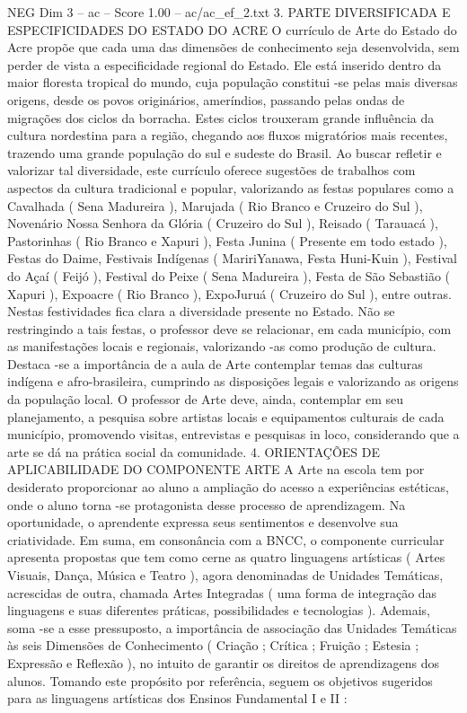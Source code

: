 \begin{textsample}{NEG Dim 3 – ac – Score 1.00 – ac/ac\_ef\_2.txt}  \label{ex:f3_neg_262}
3.
PARTE DIVERSIFICADA E ESPECIFICIDADES DO ESTADO DO ACRE O currículo de Arte do Estado do Acre propõe que cada uma das dimensões de conhecimento seja desenvolvida, sem perder de vista a especificidade regional do Estado.
Ele está inserido dentro da maior floresta tropical do mundo, cuja população constitui -se pelas mais diversas origens, desde os povos originários, ameríndios, passando pelas ondas de migrações dos ciclos da borracha.
Estes ciclos trouxeram grande influência da cultura nordestina para a região, chegando aos fluxos migratórios mais recentes, trazendo uma grande população do sul e sudeste do Brasil.
Ao buscar refletir e valorizar tal diversidade, este currículo oferece sugestões de trabalhos com aspectos da cultura tradicional e popular, valorizando as festas populares como a Cavalhada ( Sena Madureira ), Marujada ( Rio Branco e Cruzeiro do Sul ), Novenário Nossa Senhora da Glória ( Cruzeiro do Sul ), Reisado ( Tarauacá ), Pastorinhas ( Rio Branco e Xapuri ), Festa Junina ( Presente em todo estado ), Festas do Daime, Festivais Indígenas ( MaririYanawa, Festa Huni-Kuin ), Festival do Açaí ( Feijó ), Festival do Peixe ( Sena Madureira ), Festa de São Sebastião ( Xapuri ), Expoacre ( Rio Branco ), ExpoJuruá ( Cruzeiro do Sul ), entre outras.
Nestas festividades fica clara a diversidade presente no Estado.
Não se restringindo a tais festas, o professor deve se relacionar, em cada município, com as manifestações locais e regionais, valorizando -as como produção de cultura.
Destaca -se a importância de a aula de Arte contemplar temas das culturas indígena e afro-brasileira, cumprindo as disposições legais e valorizando as origens da população local.
O professor de Arte deve, ainda, contemplar em seu planejamento, a pesquisa sobre artistas locais e equipamentos culturais de cada município, promovendo visitas, entrevistas e pesquisas in loco, considerando que a arte se dá na prática social da comunidade. 4.
ORIENTAÇÕES DE APLICABILIDADE DO COMPONENTE ARTE A Arte na escola tem por desiderato proporcionar ao aluno a ampliação do acesso a experiências estéticas, onde o aluno torna -se protagonista desse processo de aprendizagem.
Na oportunidade, o aprendente expressa seus sentimentos e desenvolve sua criatividade.
Em suma, em consonância com a BNCC, o componente curricular apresenta propostas que tem como cerne as quatro linguagens artísticas ( Artes Visuais, Dança, Música e Teatro ), agora denominadas de Unidades Temáticas, acrescidas de outra, chamada Artes Integradas ( uma forma de integração das linguagens e suas diferentes práticas, possibilidades e tecnologias ).
Ademais, soma -se a esse pressuposto, a importância de associação das Unidades Temáticas às seis Dimensões de Conhecimento ( Criação ; Crítica ; Fruição ; Estesia ; Expressão e Reflexão ), no intuito de garantir os direitos de aprendizagens dos alunos.
Tomando este propósito por referência, seguem os objetivos sugeridos para as linguagens artísticas dos Ensinos Fundamental I e II :

\end{textsample}
